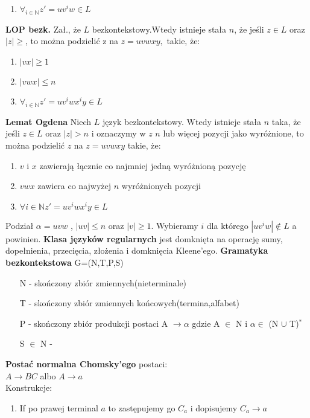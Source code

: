 \begin{multicols}{3}
\begin{enumerate}
      \item $\forall_{i \in \mathbb{N}} z'=uv^{i}w \in L$
    \end{enumerate}
    \textbf{LOP bezk.} Zał., że $L$ bezkontekstowy.Wtedy istnieje stała $n$, że jeśli $z \in L$ oraz $|z| \geqslant$, to można podzielić z na $z=uvwxy,$ takie, że:
    \begin{enumerate}
      \item $|vx| \geqslant 1$
      \item $|vwx| \leqslant n$
      \item $\forall_{i \in \mathbb{N}} z'=uv^{i}wx^{i}y \in L$
    \end{enumerate}
    \textbf{Lemat Ogdena} Niech $L$ język bezkontekstowy. Wtedy istnieje stała $n$ taka, że jeśli $z \in L$ oraz $|z| > n$ i oznaczymy w $z$ $n$ lub więcej pozycji jako wyróżnione, to można podzielić $z$ na $z = uvwxy$ takie, że:
    \begin{enumerate}
      \item $v$ i $x$ zawierają łącznie co najmniej jedną wyróżnioną pozycję
      \item $vwx$ zawiera co najwyżej $n$ wyróżnionych pozycji
      \item $\forall i \in \mathbb{N} z' = uv^{i}wx^{i}y \in L$
    \end{enumerate} 
    Podział $\alpha = uvw$ , $|uv| \leqslant n$ oraz $|v| \geqslant 1$.
    Wybieramy $i$ dla którego $|uv^{i}w| \notin L$ a powinien.
    \textbf{Klasa języków regularnych} jest domknięta na operację sumy, 
    dopełnienia, przecięcia, złożenia i domknięcia Kleene'ego.
    \textbf{Gramatyka bezkontekstowa} G=(N,T,P,S)
    \begin{enumerate}
      \item[N] - skończony zbiór zmiennych(nieterminale)
      \item[T] - skończony zbiór zmiennych końcowych(termina,alfabet)
      \item[P] - skończony zbiór produkcji postaci A $\rightarrow \alpha$ gdzie A $\in$ N i $\alpha \in$ (N $\cup$ T)$^{*}$
      \item[S $\in$ N] - 
    \end{enumerate} 
    \textbf{Postać normalna Chomsky'ego} postaci:\\
    $A \rightarrow BC$ albo $A \rightarrow a$\\
    Konstrukcje:\\
    \begin{enumerate}
      \item If po prawej terminal $a$ to zastępujemy go $C_{a}$ i dopisujemy $C_{a} \rightarrow a$

\end{enumerate}
\end{multicols}
